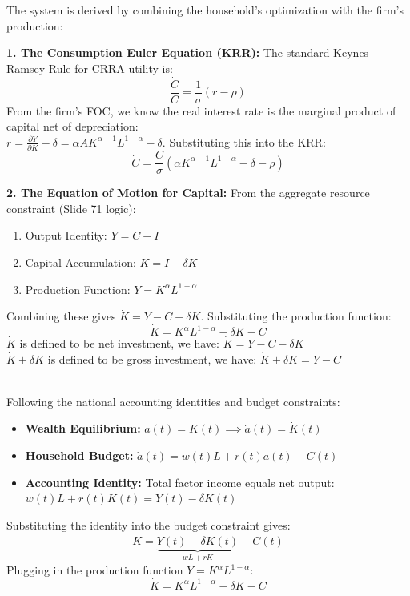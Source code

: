 \begin{tcolorbox}[
    colback=blue!5!white, %
    colframe=blue!40!white, %
    title=Derivation of the ODE system of the Ramsey model %
    ]
The system is derived by combining the household's optimization with the firm's production:

\textbf{1. The Consumption Euler Equation (KRR):}
The standard Keynes-Ramsey Rule for CRRA utility is:
$$\frac{\dot{C}}{C} = \frac{1}{\sigma}(r - \rho)$$
From the firm's FOC, we know the real interest rate is the marginal product of capital net of depreciation:\\ $r = \frac{\partial Y}{\partial K} - \delta = \alpha A K^{\alpha-1} L^{1-\alpha} - \delta$. Substituting this into the KRR:
$$\dot{C} = \frac{C}{\sigma} \left( \alpha K^{\alpha-1} L^{1-\alpha} - \delta - \rho \right)$$

\textbf{2. The Equation of Motion for Capital:}
From the aggregate resource constraint (Slide 71 logic):
\begin{enumerate}
    \item Output Identity: $Y = C + I$
    \item Capital Accumulation: $\dot{K} = I - \delta K$
    \item Production Function: $Y = K^{\alpha} L^{1-\alpha}$
\end{enumerate}
Combining these gives $\dot{K} = Y - C - \delta K$. Substituting the production function:
$$\dot{K} = K^{\alpha} L^{1-\alpha} - \delta K - C$$
$\dot{K}$ is defined to be net investment, we have: $\dot{K}=Y-C-\delta K$ \\
$\dot{K}+\delta K$ is defined to be gross investment, we have: $\dot{K}+\delta K=Y-C$
\begin{tcolorbox}[
    colback=blue!5!white, 
    colframe=black, 
    round corners, 
    boxrule=0.5pt,
    title=Alternative (market economy) version of the $\dot{K}$ equation,
    fonttitle=\bfseries,
    coltitle=black,
    attach title to upper
]
\vspace{0.5em} \\
Following the national accounting identities and budget constraints:
\begin{itemize}
    \item \textbf{Wealth Equilibrium:} $a(t) = K(t) \implies \dot{a}(t) = \dot{K}(t)$
    \item \textbf{Household Budget:} $\dot{a}(t) = w(t)L + r(t)a(t) - C(t)$
    \item \textbf{Accounting Identity:} Total factor income equals net output: 
    $w(t)L + r(t)K(t) = Y(t) - \delta K(t)$
\end{itemize}
Substituting the identity into the budget constraint gives:
$$\dot{K} = \underbrace{Y(t) - \delta K(t)}_{wL + rK} - C(t)$$
Plugging in the production function $Y = K^\alpha L^{1-\alpha}$:
$$\dot{K} = K^{\alpha} L^{1-\alpha} - \delta K - C$$
\end{tcolorbox}
\end{tcolorbox}
